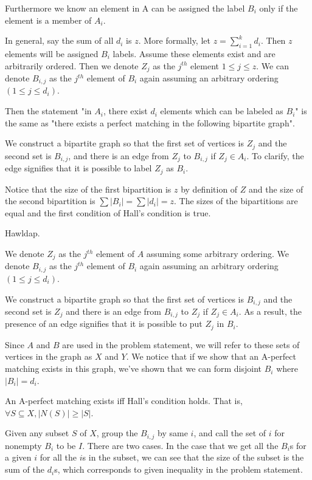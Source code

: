 \documentclass[11pt,letterpaper]{article}
\begin{document}
Furthermore we know an element in A can be assigned the label $B_i$ only if the element is a member of $A_i$.

In general, say the sum of all $d_i$ is $z$. More formally, let $z = \sum_{i=1}^k d_i$. Then $z$ elements will be assigned $B_i$ labels. Assume these elements exist and are arbitrarily ordered. Then we denote $Z_j$ as the $j^{th}$ element $1\leq j \leq z$.
We can denote $B_{i,j}$ as the $j^{th}$ element of $B_i$ again assuming an arbitrary ordering $(1 \leq j \leq d_i)$.

Then the statement "in $A_i$, there exist $d_i$ elements which can be labeled as $B_i$" is the same as "there exists a perfect matching in the following bipartite graph".

We construct a bipartite graph so that the first set of vertices is
$Z_j$ and the second set is $B_{i,j}$, and there is an edge from $Z_j$ to $B_{i,j}$ if $Z_j \in A_i$.
To clarify, the edge signifies that it is possible to label $Z_j$ as $B_i$.

Notice that the size of the first bipartition is $z$ by definition of $Z$ and the size of the second bipartition is $\sum |B_i| = \sum |d_i| = z$.
The sizes of the bipartitions are equal and the first condition of Hall's condition is true.

Hawldap.

We denote $Z_j$ as the $j^{th}$ element of $A$ assuming some arbitrary ordering.
We denote $B_{i,j}$ as the $j^{th}$ element of $B_i$ again assuming an arbitrary ordering $(1 \leq j \leq d_i)$.

We construct a bipartite graph so that the first set of vertices is
$B_{i,j}$
and the second set is
$Z_j$
and there is an edge from $B_{i,j}$ to $Z_j$ if $Z_j \in A_i$.
As a result, the presence of an edge signifies that it is possible to put $Z_j$ in $B_i$.

Since $A$ and $B$ are used in the problem statement, we will refer to these sets of vertices in the graph as $X$ and $Y$.
We notice that if we show that an A-perfect matching exists in this graph, we've shown that we can form disjoint $B_i$ where $|B_i| = d_i$.

An A-perfect matching exists iff Hall's condition holds. That is, $\forall S \subseteq X, |N(S)| \geq |S|$.

Given any subset $S$ of $X$, group the $B_{i,j}$ by same $i$, and call the set of $i$ for nonempty $B_i$ to be $I$.
There are two cases. In the case that we get all the $B_i$s for a given $i$ for all the $i$s in the subset,
we can see that the size of the subset is the sum of the $d_i$s, which corresponds to given inequality in the problem statement.
\end{document}
